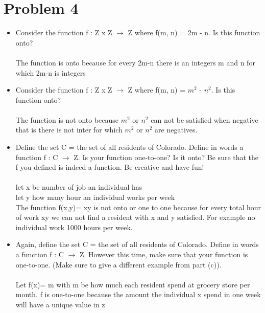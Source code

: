 \documentclass[12pt,letterpaper]{article}
\begin{document}
\section*{Problem 4}
\begin{itemize}
  \item Consider the function f : Z x Z \(\rightarrow \) Z where f(m, n) = 2m - n. Is this function onto?\\\\
  The function is onto because for every 2m-n there is an integers
  m and n for which 2m-n is integers
  \item Consider the function f : Z x Z \(\rightarrow \) Z where f(m, n) = \(m^2\) - \(n^2\). Is this function onto?\\\\
  The function is not onto because  \(m^2\) or \(n^2\) can not be satisfied when 
  negative that is there is not inter for which \(m^2\) or \(n^2\) are negatives.
  \item Define the set C = the set of all residents of Colorado. Define in words a function f : C \(\rightarrow \) Z. Is
  your function one-to-one? Is it onto? Be sure that the f you defined is indeed a function. Be
  creative and have fun!\\\\
  let x be number of job an individual has\\
  let y how many hour an individual works per week\\
  The function f(x,y)= xy is not onto or one to one because for every total
  hour of work xy we can not find a resident with x and y satisfied. For example no individual work 1000 hours per week.
  \item  Again, define the set C = the set of all residents of Colorado. Define in words a function f : C \(\rightarrow \) Z.
  However this time, make sure that your function is one-to-one. (Make sure to give a different
  example from part (c)).\\\\
  Let f(x)= m with m be how much each resident spend at grocery store per month.
  f is  one-to-one because the amount the individual x spend 
  in one week will have a unique value in z 
\end{itemize}

\end{document}
